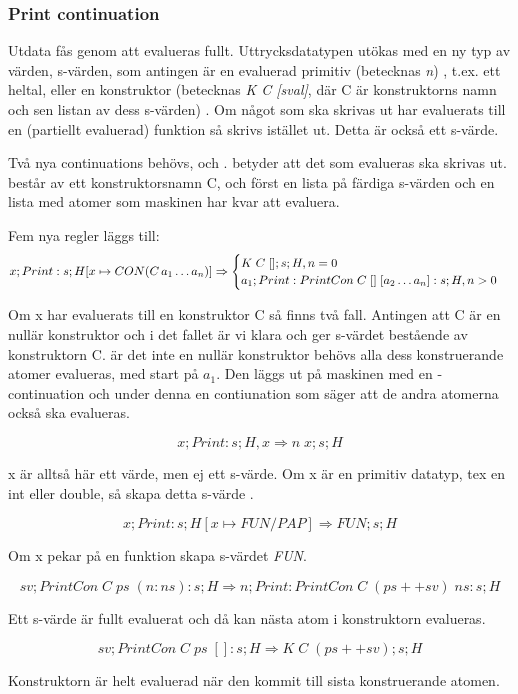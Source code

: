 \documentclass[../Core]{subfiles}
\begin{document}
\subsubsection{Print continuation}
Utdata fås genom att  evalueras fullt. %
Uttrycksdatatypen utökas med en ny typ av värden, 
s-värden, som antingen är en evaluerad primitiv (betecknas \emph{n})
, t.ex. ett heltal, eller en konstruktor (betecknas \emph{K C [sval]}, där
C är konstruktorns namn och sen listan av dess s-värden) .
Om något som ska skrivas ut har evaluerats till en (partiellt evaluerad)
funktion så skrivs  istället ut. Detta är också ett s-värde.





Två nya continuations behövs,  och .
 betyder att det som evalueras ska skrivas ut.  består av ett
konstruktorsnamn C, och först en lista på färdiga s-värden och en lista med
atomer som maskinen har kvar att evaluera.

Fem nya regler läggs till:
\[
x ; Print : s ; H[x \mapsto CON(C\,a_1 \ldots a_n)]
\Rightarrow \begin{cases} 
K \; C \; [] ; s ; H , n = 0 \\
a_1 ; Print : PrintCon \; C \; [] \; [a_2 \ldots a_n] : s ; H , n > 0
\end{cases}
\]

Om x har evaluerats till en konstruktor C så finns två fall. Antingen att C är
en nullär konstruktor och i det fallet är vi klara och ger s-värdet bestående
av konstruktorn C.
    är det inte en nullär konstruktor behövs alla dess konstruerande atomer
evalueras, med start på $a_1$. Den läggs ut på maskinen med en -continuation
och under denna en contiunation som säger att de andra atomerna också ska
evalueras.
 

\[
x ; Print : s ; H , x
\Rightarrow n \; x ; s ; H
\]

x är alltså här ett värde, men ej ett s-värde.
Om x är en primitiv datatyp, tex en int eller double, så skapa detta s-värde
.


\[
x ; Print : s ; H[x \mapsto FUN / PAP]
\Rightarrow FUN ; s ; H
\]

Om x pekar på en funktion skapa s-värdet \emph{FUN}.


\[
sv ; PrintCon \; C \; ps \; (n : ns) : s ; H
\Rightarrow n ; Print : PrintCon \; C \; (ps ++ sv) \; ns : s ; H
\]


Ett s-värde är fullt evaluerat och då kan nästa atom i konstruktorn evalueras. 


\[
sv ; PrintCon \; C \; ps \; [] : s ; H
\Rightarrow K \; C \; (ps ++ sv) ; s ; H
\]

Konstruktorn är helt evaluerad när den kommit till sista konstruerande atomen.
\end{document}
